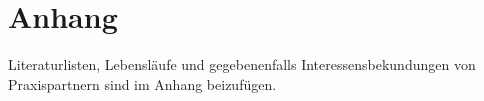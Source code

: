 \documentclass[a4paper,11pt,twoside]{scrartcl}
\begin{document}
\clearpage


%


\clearpage
\appendix

\section{Anhang}

Literaturlisten, Lebensläufe und gegebenenfalls Interessensbekundungen von Praxispartnern sind im Anhang beizufügen.
\end{document}
